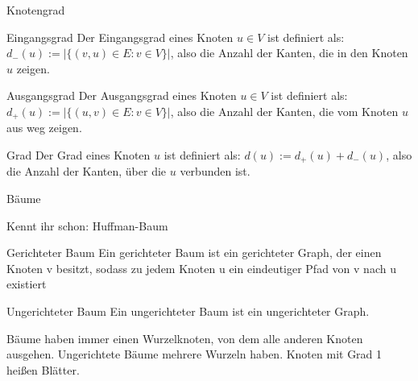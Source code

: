 \documentclass[handout]{beamer}
\begin{document}
\begin{frame}{Knotengrad}
	
	
	\begin{block}{Eingangsgrad}
		Der Eingangsgrad eines Knoten $u \in V$ ist definiert als: $d_{-}(u) := |\{(v, u) \in E: v \in V\}|$\ip, also die Anzahl der Kanten, die in den Knoten $u$ zeigen.
	\end{block}

	\bp 

	\begin{block}{Ausgangsgrad}
	Der Ausgangsgrad eines Knoten $u \in V$ ist definiert als: $d_{+}(u) := |\{(u, v) \in E: v \in V\}|$\ip, also die Anzahl der Kanten, die vom Knoten $u$ aus weg zeigen.
	\end{block}

	\bp
	
	\begin{block}{Grad}
		Der Grad eines Knoten $u$ ist definiert als: $d(u) := d_{+}(u) + d_{-}(u)$\ip, also die Anzahl der Kanten, über die $u$ verbunden ist.
	\end{block}
\end{frame}

\begin{frame}{Bäume}
	
	
	\begin{itemize}
		\pitem Kennt ihr schon: Huffman-Baum
	\end{itemize}

	\begin{block}{Gerichteter Baum}
	Ein gerichteter Baum ist ein gerichteter Graph, der einen Knoten v besitzt, sodass zu jedem Knoten u ein eindeutiger Pfad von v nach u existiert
	\end{block}

	\bp

	\begin{block}{Ungerichteter Baum}
		Ein ungerichteter Baum ist ein  ungerichteter Graph.	
	\end{block}

	\bp

	\begin{itemize}
		\pitem Bäume haben immer einen Wurzelknoten, von dem alle anderen Knoten ausgehen.
		\pitem Ungerichtete Bäume  mehrere Wurzeln haben.
		\pitem Knoten mit Grad 1 heißen Blätter.
	\end{itemize} 
\end{frame}
\end{document}
